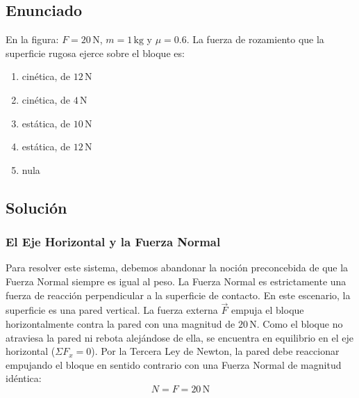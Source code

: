 \documentclass[12pt]{article}
\begin{document}
\subsection*{Enunciado}
En la figura: $F = 20 \, \text{N}$, $m = 1 \, \text{kg}$ y $\mu = 0.6$. La fuerza de rozamiento que la superficie rugosa ejerce sobre el bloque es:
\begin{enumerate}
    \item[a)] cinética, de $12 \, \text{N}$
    \item[b)] cinética, de $4 \, \text{N}$
    \item[c)] estática, de $10 \, \text{N}$
    \item[d)] estática, de $12 \, \text{N}$
    \item[e)] nula
\end{enumerate}

\begin{center}
\end{center}

\subsection*{Solución}

\subsubsection*{El Eje Horizontal y la Fuerza Normal}
Para resolver este sistema, debemos abandonar la noción preconcebida de que la Fuerza Normal siempre es igual al peso. La Fuerza Normal es estrictamente una fuerza de reacción perpendicular a la superficie de contacto. En este escenario, la superficie es una pared vertical. 
La fuerza externa $\vec{F}$ empuja el bloque horizontalmente contra la pared con una magnitud de $20 \, \text{N}$. Como el bloque no atraviesa la pared ni rebota alejándose de ella, se encuentra en equilibrio en el eje horizontal ($\Sigma F_x = 0$). Por la Tercera Ley de Newton, la pared debe reaccionar empujando el bloque en sentido contrario con una Fuerza Normal de magnitud idéntica:
\begin{equation}
    N = F = 20 \, \text{N}
\end{equation}
\end{document}
